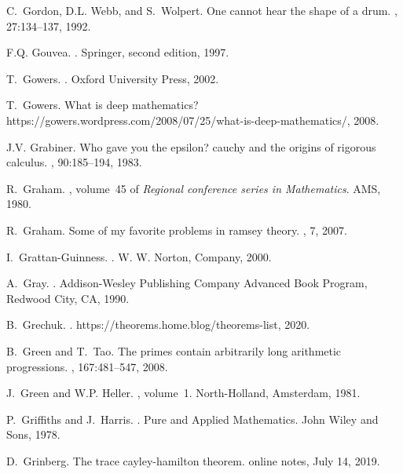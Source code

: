 \documentclass[12pt]{amsart}
\begin{document}
\begin{thebibliography}{100}
C.~Gordon, D.L. Webb, and S.~Wolpert.
\newblock One cannot hear the shape of a drum.
,
  27:134--137, 1992.

F.Q. Gouvea.
.
\newblock Springer, second edition, 1997.

T.~Gowers.
.
\newblock Oxford University Press, 2002.

T.~Gowers.
\newblock What is deep mathematics?
\newblock https://gowers.wordpress.com/2008/07/25/what-is-deep-mathematics/,
  2008.

J.V. Grabiner.
\newblock Who gave you the epsilon? cauchy and the origins of rigorous
  calculus.
, 90:185--194, 1983.

R.~Graham.
, volume~45 of {\em Regional
  conference series in Mathematics}.
\newblock AMS, 1980.

R.~Graham.
\newblock Some of my favorite problems in ramsey theory.
, 7,
  2007.

I.~Grattan-Guinness.
.
\newblock W. W. Norton, Company, 2000.

A.~Gray.
.
\newblock Addison-Wesley Publishing Company Advanced Book Program, Redwood
  City, CA, 1990.

B.~Grechuk.
.
\newblock https://theorems.home.blog/theorems-list, 2020.

B.~Green and T.~Tao.
\newblock The primes contain arbitrarily long arithmetic progressions.
, 167:481--547, 2008.

J.~Green and W.P. Heller.
, volume~1.
\newblock North-Holland, Amsterdam, 1981.

P.~Griffiths and J.~Harris.
.
\newblock Pure and Applied Mathematics. John Wiley and Sons, 1978.

D.~Grinberg.
\newblock The trace cayley-hamilton theorem.
\newblock online notes, July 14, 2019.


\end{thebibliography}
\end{document}
